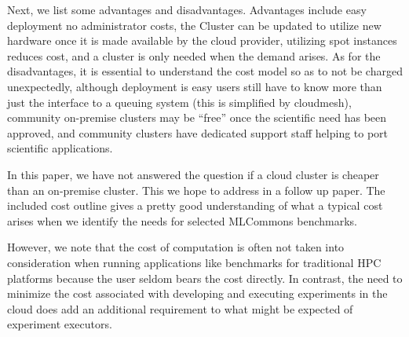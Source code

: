 Next, we list some advantages and disadvantages. Advantages include easy deployment no administrator costs, the Cluster can be updated to utilize new hardware once it is made available by the cloud provider, utilizing spot instances reduces cost, and a cluster is only needed when the demand arises. As for the disadvantages, it is essential to understand the cost model so as to not be charged unexpectedly, although deployment is easy users still have to know more than just the interface to a queuing system (this is simplified by cloudmesh), community on-premise clusters may be ``free'' once the scientific need has been approved, and community clusters have dedicated support staff helping to port scientific applications.

In this paper, we have not answered the question if a cloud cluster is cheaper than an on-premise cluster. This we hope to address in a follow up paper. The included cost outline gives a pretty good understanding of what a typical cost arises when we identify the needs for selected MLCommons benchmarks.

However, we note that the cost of computation is often not taken into consideration when running applications like benchmarks for traditional HPC platforms because the user seldom bears the cost directly. In contrast, the need to minimize the cost associated with developing and executing experiments in the cloud does add an additional requirement to what might be expected of experiment executors.
